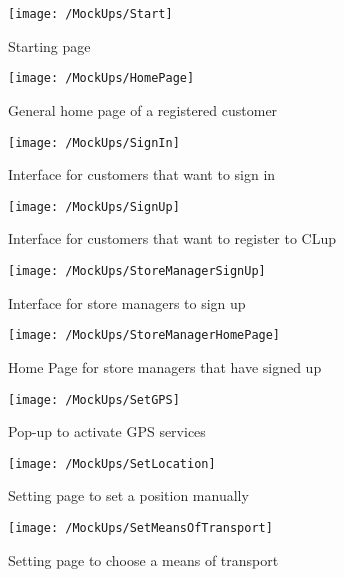 \begin{figure}[H]
	\centering
	\texttt{[image: /MockUps/Start]}
	\caption{Starting page}
\end{figure}

\begin{figure}[H]
	\centering
	\texttt{[image: /MockUps/HomePage]}
	\caption{General home page of a registered customer}
\end{figure}

\newpage

\begin{figure}[H]
	\centering
	\texttt{[image: /MockUps/SignIn]}
	\caption{Interface for customers that want to sign in}
\end{figure}

\begin{figure}[H]
	\centering
	\texttt{[image: /MockUps/SignUp]}
	\caption{Interface for customers that want to register to CLup}
\end{figure}

\newpage

\begin{figure}[H]
	\centering
	\texttt{[image: /MockUps/StoreManagerSignUp]}
	\caption{Interface for store managers to sign up}
\end{figure}

\begin{figure}[H]
	\centering
	\texttt{[image: /MockUps/StoreManagerHomePage]}
	\caption{Home Page for store managers that have signed up}
\end{figure}

\newpage

\begin{figure}[H]
	\centering
	\texttt{[image: /MockUps/SetGPS]}
	\caption{Pop-up to activate GPS services}
\end{figure}

\begin{figure}[H]
	\centering
	\texttt{[image: /MockUps/SetLocation]}
	\caption{Setting page to set a position manually}
\end{figure}

\newpage

\begin{figure}[H]
	\centering
	\texttt{[image: /MockUps/SetMeansOfTransport]}
	\caption{Setting page to choose a means of transport}
\end{figure}

